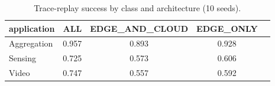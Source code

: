 \begin{table}[t]
\centering
\footnotesize
\caption{Trace-replay success by class and architecture (10 seeds).}
\label{tab:p1-trace-classes}
\begin{tabular}{lcccc}
\toprule
application & ALL & EDGE\_AND\_CLOUD & EDGE\_ONLY \\
\midrule
Aggregation & 0.957 & 0.893 & 0.928 \\
Sensing & 0.725 & 0.573 & 0.606 \\
Video & 0.747 & 0.557 & 0.592 \\
\bottomrule
\end{tabular}
\par\vspace{2pt}{\footnotesize\raggedright The trace arm is class-balanced and its deadlines are 2-5 s, above the control interval, so every class is served.\par}
\end{table}
